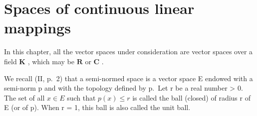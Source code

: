 \chapter{Spaces of continuous linear mappings}

In this chapter, all the vector spaces under consideration are vector spaces over a field \(\mathbf{K}\) , which may be \(\mathbf{R}\) or \(\mathbf{C}\) .

We recall (II, p.~2) that a semi-normed space is a vector space E endowed with a semi-norm p and with the topology defined by p.~Let r be a real number \textgreater{} 0. The set of all \(x \in E\) such that \(p(x) \leqslant r\) is called the ball (closed) of radius r of E (or of p). When r = 1, this ball is also called the unit ball.

